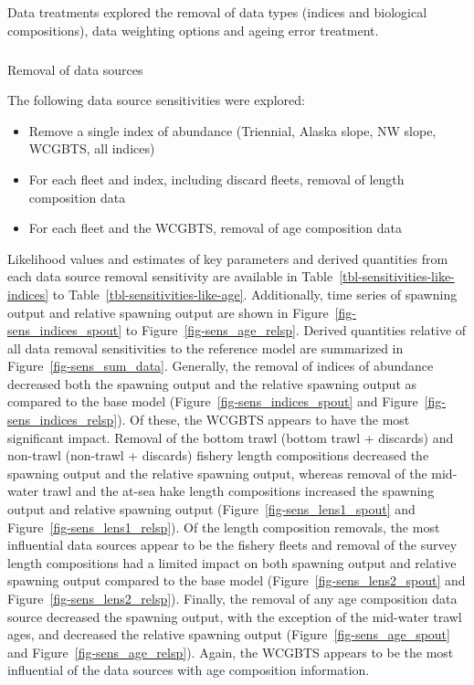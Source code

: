 \documentclass[
]{scrartcl}
\makeatletter
\let\oldsubparagraph\subparagraph
\renewcommand{\subparagraph}{
    \@ifstar
      \xxxSubParagraphStar
      \xxxSubParagraphNoStar
  }
\newcommand{\xxxSubParagraphStar}[1]{\oldsubparagraph*{#1}\mbox{}}
\newcommand{\xxxSubParagraphNoStar}[1]{\oldsubparagraph{#1}\mbox{}}
\providecommand{\tightlist}{%
  \setlength{\itemsep}{0pt}\setlength{\parskip}{0pt}}\usepackage{longtable,booktabs,array}
\makeatother
\begin{document}
Data treatments explored the removal of data types (indices and
biological compositions), data weighting options and ageing error
treatment.

\subparagraph{Removal of data sources}\label{removal-of-data-sources}

The following data source sensitivities were explored:

\begin{itemize}
\tightlist
\item
  Remove a single index of abundance (Triennial, Alaska slope, NW slope,
  WCGBTS, all indices)
\item
  For each fleet and index, including discard fleets, removal of length
  composition data
\item
  For each fleet and the WCGBTS, removal of age composition data
\end{itemize}

Likelihood values and estimates of key parameters and derived quantities
from each data source removal sensitivity are available in
Table~\ref{tbl-sensitivities-like-indices} to
Table~\ref{tbl-sensitivities-like-age}. Additionally, time series of
spawning output and relative spawning output are shown in
Figure~\ref{fig-sens_indices_spout} to Figure~\ref{fig-sens_age_relsp}.
Derived quantities relative of all data removal sensitivities to the
reference model are summarized in Figure~\ref{fig-sens_sum_data}.
Generally, the removal of indices of abundance decreased both the
spawning output and the relative spawning output as compared to the base
model (Figure~\ref{fig-sens_indices_spout} and
Figure~\ref{fig-sens_indices_relsp}). Of these, the WCGBTS appears to
have the most significant impact. Removal of the bottom trawl (bottom
trawl + discards) and non-trawl (non-trawl + discards) fishery length
compositions decreased the spawning output and the relative spawning
output, whereas removal of the mid-water trawl and the at-sea hake
length compositions increased the spawning output and relative spawning
output (Figure~\ref{fig-sens_lens1_spout} and
Figure~\ref{fig-sens_lens1_relsp}). Of the length composition removals,
the most influential data sources appear to be the fishery fleets and
removal of the survey length compositions had a limited impact on both
spawning output and relative spawning output compared to the base model
(Figure~\ref{fig-sens_lens2_spout} and
Figure~\ref{fig-sens_lens2_relsp}). Finally, the removal of any age
composition data source decreased the spawning output, with the
exception of the mid-water trawl ages, and decreased the relative
spawning output (Figure~\ref{fig-sens_age_spout} and
Figure~\ref{fig-sens_age_relsp}). Again, the WCGBTS appears to be the
most influential of the data sources with age composition information.
\end{document}
